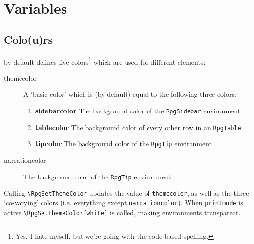 \chapter{Variables}
	\section{Colo(u)rs}\label{S:Colors}

		\rpgtex{} by default defines five colors\footnote{Yes, I hate myself, but we're going with the code-based spelling.} which are used for different elements:
		\begin{description}
			\item[themecolor] A `basic color' which is (by default) equal to the following three colors:
			\begin{enumerate}
				\item \textbf{sidebarcolor} The background color of the \verb|RpgSidebar| environment
				\item \textbf{tablecolor} The background color of every other row in an \verb|RpgTable| 
				\item \textbf{tipcolor} The background color of the \verb|RpgTip| environment 
			\end{enumerate} 
			\item[narrationcolor]  The background color of the \verb|RpgTip| environment 
		\end{description}

		Calling \verb|\RpgSetThemeColor|  updates the value of \verb|themecolor|, as well as the three `co-varying' colors (i.e. everything except \verb|narrationcolor|). When \verb|printmode| is active \verb|\RpgSetThemeColor{white}| is called, making environments transparent.
